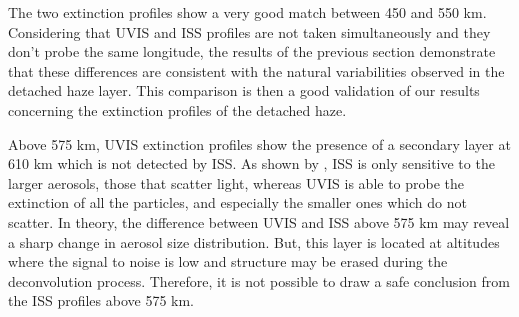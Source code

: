 The two extinction profiles show a very good match 
between 450 and 550 km. Considering that UVIS and ISS profiles are not taken simultaneously and
they don't probe the same longitude, the results of the previous section demonstrate that these differences are
consistent with the natural variabilities observed in the detached haze layer.
This comparison is then a good validation of our results concerning the extinction profiles of the detached haze.

Above 575 km, UVIS extinction profiles show the presence of a secondary layer at 610 km which is not detected
by ISS. As shown by \cite{Cours2011}, ISS is only sensitive to the larger aerosols, those that scatter light, whereas
UVIS is able to probe the extinction of all the particles, and especially the smaller ones which do not scatter.
In theory, the difference between UVIS and ISS above 575 km may reveal a sharp change in aerosol size distribution.
But, this layer is located at altitudes where the signal to noise is low and structure may be erased during the
deconvolution process. Therefore, it is not possible to draw a safe conclusion from the ISS profiles above 575 km.
